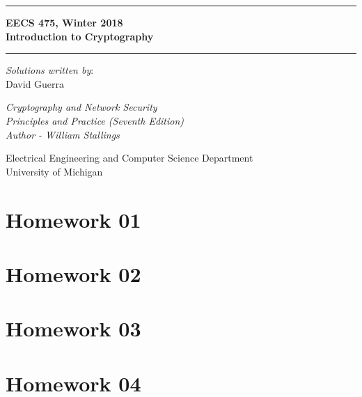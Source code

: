 \documentclass[answers]{exam}  %
\begin{document}
	\begin{titlepage}
		\begin{center}
			\vspace*{4cm}

			\hrule
			\vspace{0.5cm}
			{ 
				\LARGE 
				\textbf{EECS 475, Winter 2018}\\
				\textbf{Introduction to Cryptography}
			}
			\vspace{0.5cm}
			\hrule

			\vspace{2cm}

			\textit{Solutions written by}:\\
			{\large David Guerra}

			\vfill

			{ \Large \textit{Cryptography and Network Security}\\ }
			{ \Large \textit{Principles and Practice (Seventh Edition)}\\ }
			{ \Large \textit{Author - William Stallings} }

			\vspace{2cm}

			\Large
			Electrical Engineering and Computer Science Department\\
			University of Michigan

		\end{center}
	\end{titlepage}
	\newpage

	\tableofcontents
	\newpage

	\section{Homework 01}
	
	\newpage

	\section{Homework 02}
	
	\newpage

	\section{Homework 03}
	
	\newpage

	\section{Homework 04}
	
	\newpage



\end{document}
